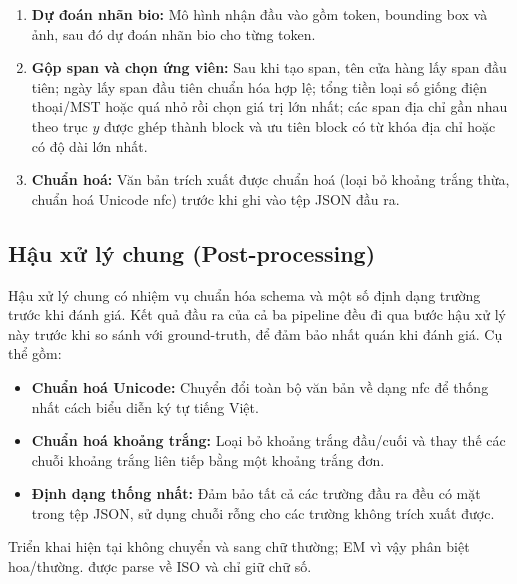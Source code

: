 \begin{enumerate}
  \item \textbf{Dự đoán nhãn \gls{bio}:} Mô hình  nhận
    đầu vào gồm token, bounding box và ảnh, sau đó dự đoán nhãn \gls{bio}
    cho từng token.

  \item \textbf{Gộp span và chọn ứng viên:} Sau khi tạo span, tên cửa hàng lấy span đầu tiên; ngày lấy span đầu tiên chuẩn hóa hợp lệ; tổng tiền loại số giống điện thoại/MST hoặc quá nhỏ rồi chọn giá trị lớn nhất; các span địa chỉ gần nhau theo trục $y$ được ghép thành block và ưu tiên block có từ khóa địa chỉ hoặc có độ dài lớn nhất.

  \item \textbf{Chuẩn hoá:} Văn bản trích xuất được chuẩn hoá (loại bỏ
    khoảng trắng thừa, chuẩn hoá Unicode \gls{nfc}) trước khi ghi vào
    tệp JSON đầu ra.
\end{enumerate}


\subsection{Hậu xử lý chung (Post-processing)}
\label{subsec:postprocessing}

Hậu xử lý chung có nhiệm vụ chuẩn hóa schema và một số định dạng trường trước khi đánh giá.
Kết quả đầu ra của cả ba pipeline đều đi qua bước hậu xử lý này trước khi so sánh với ground-truth, để đảm bảo nhất quán khi đánh giá.
Cụ thể gồm:

\begin{itemize}
  \item \textbf{Chuẩn hoá Unicode:} Chuyển đổi toàn bộ văn bản về dạng
    \gls{nfc} để thống nhất cách biểu diễn ký tự tiếng Việt.

  \item \textbf{Chuẩn hoá khoảng trắng:} Loại bỏ khoảng trắng đầu/cuối
    và thay thế các chuỗi khoảng trắng liên tiếp bằng một khoảng trắng đơn.

  \item \textbf{Định dạng thống nhất:} Đảm bảo tất cả các trường đầu ra
    đều có mặt trong tệp JSON, sử dụng chuỗi rỗng cho các trường không
    trích xuất được.
\end{itemize}

Triển khai hiện tại không chuyển  và  sang chữ thường; EM vì vậy phân biệt hoa/thường.  được parse về ISO và  chỉ giữ chữ số.
